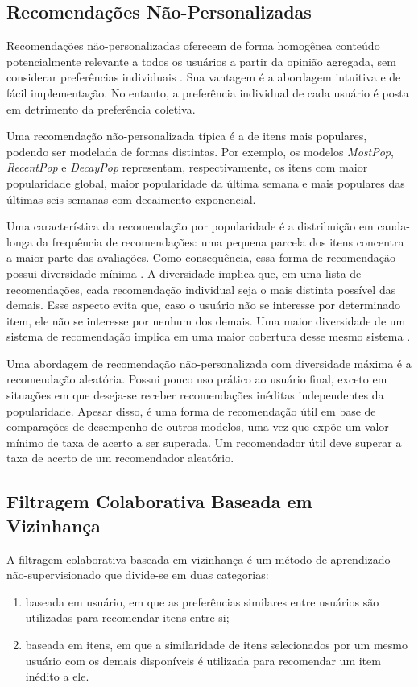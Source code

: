 \subsection{Recomendações Não-Personalizadas}
Recomendações não-personalizadas oferecem de forma homogênea conteúdo
potencialmente relevante a todos os usuários a partir da opinião agregada, sem
considerar preferências individuais \cite{poriya2014non}. Sua vantagem é a
abordagem intuitiva e de fácil implementação. No entanto, a preferência
individual de cada usuário é posta em detrimento da preferência coletiva.

Uma recomendação não-personalizada típica é a de itens mais populares, podendo
ser modelada de formas distintas. Por exemplo, os modelos \textit{MostPop},
\textit{RecentPop} e \textit{DecayPop} \cite{ji2020re, jing2023capturing}
representam, respectivamente, os itens com maior popularidade global, maior
popularidade da última semana e mais populares das últimas seis semanas com
decaimento exponencial.

Uma característica da recomendação por popularidade é a distribuição em
cauda-longa da frequência de recomendações: uma pequena parcela dos itens
concentra a maior parte das avaliações. Como consequência, essa forma de
recomendação possui diversidade mínima \cite{aggarwal2016recommender}. A
diversidade implica que, em uma lista de recomendações, cada recomendação
individual seja o mais distinta possível das demais. Esse aspecto evita que,
caso o usuário não se interesse por determinado item, ele não se interesse por
nenhum dos demais. Uma maior diversidade de um sistema de recomendação implica
em uma maior cobertura desse mesmo sistema \cite{aggarwal2016recommender}.

Uma abordagem de recomendação não-personalizada com diversidade máxima é a
recomendação aleatória. Possui pouco uso prático ao usuário final, exceto em
situações em que deseja-se receber recomendações inéditas independentes da
popularidade. Apesar disso, é uma forma de recomendação útil em base de
comparações de desempenho de outros modelos, uma vez que expõe um valor mínimo
de taxa de acerto a ser superada. Um recomendador útil deve superar a taxa de
acerto de um recomendador aleatório.

\subsection{Filtragem Colaborativa Baseada em Vizinhança} A filtragem
colaborativa baseada em vizinhança é um método de aprendizado não-supervisionado
que divide-se em duas categorias:
\begin{enumerate}
    \item baseada em usuário, em
que as preferências similares entre usuários são utilizadas para recomendar
itens entre si;
    \item baseada em itens, em que a similaridade de itens selecionados
por um mesmo usuário com os demais disponíveis é utilizada para recomendar um
item inédito a ele.
\end{enumerate}


